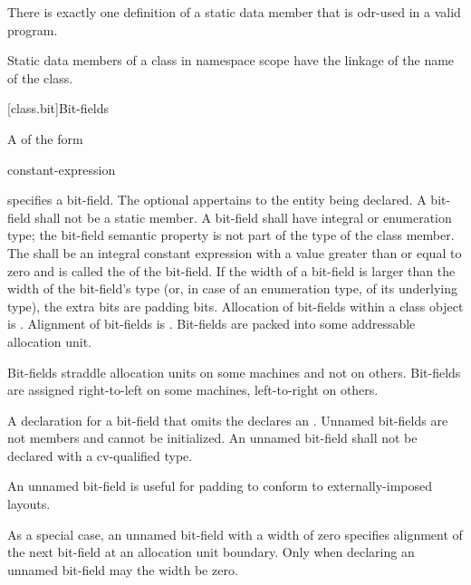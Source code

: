 \pnum
\begin{note}
There is exactly one definition of a static data member
that is odr-used in a valid program.
\end{note}

\pnum
\begin{note}
Static data members of a class in namespace scope have the linkage of the name of the class.
\end{note}

[class.bit]{Bit-fields}%

\pnum
A  of the form
\begin{ncsimplebnf}
  \terminal{:} constant-expression 
\end{ncsimplebnf}
%
%
specifies a bit-field.
The optional  appertains
to the entity being declared.
A bit-field shall not be a static member.
%
A bit-field shall have integral or enumeration type;
the bit-field semantic property is not part of the type of the class member.
The  shall be an integral constant expression
with a value greater than or equal to zero and
is called the  of the bit-field.
If the width of a bit-field is larger than
the width of the bit-field's type
(or, in case of an enumeration type, of its underlying type),
the extra bits are padding bits.
%
Allocation of bit-fields within a class object is
.
%
Alignment of bit-fields is .
%
Bit-fields are packed into some addressable allocation unit.
\begin{note}
Bit-fields straddle allocation units on some machines and not on others.
Bit-fields are assigned right-to-left on some machines, left-to-right on
others.
\end{note}

\pnum
{}%
A declaration for a bit-field that omits the 
declares an . Unnamed bit-fields are not
members and cannot be initialized.
An unnamed bit-field shall not be declared with a cv-qualified type.
\begin{note}
An unnamed bit-field is useful for padding to conform to
externally-imposed layouts.
\end{note}
%
%
As a special case, an unnamed bit-field with a width of zero specifies
alignment of the next bit-field at an allocation unit boundary. Only
when declaring an unnamed bit-field may the width be zero.

